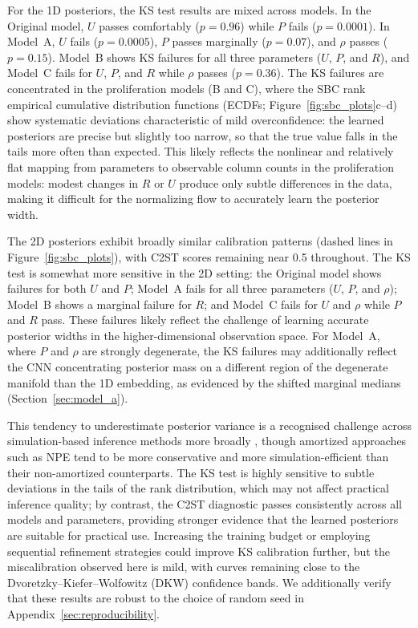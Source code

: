 \documentclass{article}
\begin{document}
For the 1D posteriors, the KS test results are mixed across models. In the Original model, $U$ passes comfortably ($p = 0.96$) while $P$ fails ($p = 0.0001$). In Model~A, $U$ fails ($p = 0.0005$), $P$ passes marginally ($p = 0.07$), and $\rho$ passes ($p = 0.15$). Model~B shows KS failures for all three parameters ($U$, $P$, and $R$), and Model~C fails for $U$, $P$, and $R$ while $\rho$ passes ($p = 0.36$). The KS failures are concentrated in the proliferation models (B and C), where the SBC rank empirical cumulative distribution functions (ECDFs; Figure~\ref{fig:sbc_plots}c--d) show systematic deviations characteristic of mild overconfidence: the learned posteriors are precise but slightly too narrow, so that the true value falls in the tails more often than expected. This likely reflects the nonlinear and relatively flat mapping from parameters to observable column counts in the proliferation models: modest changes in $R$ or $U$ produce only subtle differences in the data, making it difficult for the normalizing flow to accurately learn the posterior width.

The 2D posteriors exhibit broadly similar calibration patterns (dashed lines in Figure~\ref{fig:sbc_plots}), with C2ST scores remaining near 0.5 throughout. The KS test is somewhat more sensitive in the 2D setting: the Original model shows failures for both $U$ and $P$; Model~A fails for all three parameters ($U$, $P$, and $\rho$); Model~B shows a marginal failure for $R$; and Model~C fails for $U$ and $\rho$ while $P$ and $R$ pass. These failures likely reflect the challenge of learning accurate posterior widths in the higher-dimensional observation space. For Model~A, where $P$ and $\rho$ are strongly degenerate, the KS failures may additionally reflect the CNN concentrating posterior mass on a different region of the degenerate manifold than the 1D embedding, as evidenced by the shifted marginal medians (Section~\ref{sec:model_a}).

This tendency to underestimate posterior variance is a recognised challenge across simulation-based inference methods more broadly \citep{hermans2022crisis}, though amortized approaches such as NPE tend to be more conservative and more simulation-efficient than their non-amortized counterparts. The KS test is highly sensitive to subtle deviations in the tails of the rank distribution, which may not affect practical inference quality; by contrast, the C2ST diagnostic passes consistently across all models and parameters, providing stronger evidence that the learned posteriors are suitable for practical use. Increasing the training budget or employing sequential refinement strategies could improve KS calibration further, but the miscalibration observed here is mild, with curves remaining close to the Dvoretzky--Kiefer--Wolfowitz (DKW) confidence bands. We additionally verify that these results are robust to the choice of random seed in Appendix~\ref{sec:reproducibility}.
\end{document}
